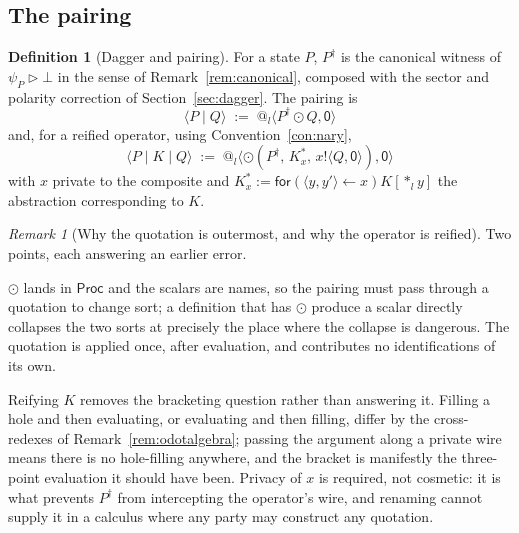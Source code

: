 \documentclass[11pt]{article}
\makeatletter
\theoremstyle{definition}
\newtheorem{definition}[theorem]{Definition}
\theoremstyle{remark}
\newtheorem{remark}[theorem]{Remark}
\newcommand{\Proc}{\mathsf{Proc}}
\newcommand{\pzero}{\mathsf{0}}
\newcommand{\quo}[1]{\ensuremath{@_{#1}}}
\newcommand{\drp}[1]{\ensuremath{*_{#1}}}
\newcommand{\dip}[2]{\ensuremath{\langle #1 , #2 \rangle}}
\makeatother
\begin{document}
\subsection{The pairing}

\begin{definition}[Dagger and pairing]
\label{def:pairing}
For a state $P$, $P^{\dagger}$ is the canonical witness of $\psi_P \rhd \bot$ in
the sense of Remark~\ref{rem:canonical}, composed with the sector and polarity
correction of Section~\ref{sec:dagger}. The pairing is
\[
  \langle P \mid Q \rangle \;:=\; \quo{l}\dip{P^{\dagger} \odot Q}{\pzero}
\]
and, for a reified operator, using Convention~\ref{con:nary},
\[
  \langle P \mid K \mid Q \rangle \;:=\;
  \quo{l}\dip{\odot\!\left(P^{\dagger},\, K^{*}_{x},\, x!\dip{Q}{\pzero}\right)}{\pzero}
\]
with $x$ private to the composite and $K^{*}_{x} :=
\mathsf{for}(\dip{y}{y'} \leftarrow x)K[\drp{l}y]$ the abstraction
corresponding to $K$.
\end{definition}

\begin{remark}[Why the quotation is outermost, and why the operator is reified]
\label{rem:outermost}
Two points, each answering an earlier error.

$\odot$ lands in $\Proc$ and the scalars are names, so the pairing must pass
through a quotation to change sort; a definition that has $\odot$ produce a
scalar directly collapses the two sorts at precisely the place where the
collapse is dangerous. The quotation is applied once, after evaluation, and
contributes no identifications of its own.

Reifying $K$ removes the bracketing question rather than answering it. Filling a
hole and then evaluating, or evaluating and then filling, differ by the
cross-redexes of Remark~\ref{rem:odotalgebra}; passing the argument along a
private wire means there is no hole-filling anywhere, and the bracket is
manifestly the three-point evaluation it should have been. Privacy of $x$ is
required, not cosmetic: it is what prevents $P^{\dagger}$ from intercepting the
operator's wire, and renaming cannot supply it in a calculus where any party may
construct any quotation.
\end{remark}
\end{document}
